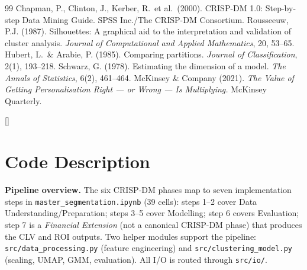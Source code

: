 \documentclass[10pt,a4paper]{article}
\begin{document}
{\begin{thebibliography}{99}
  Chapman, P., Clinton, J., Kerber, R.\ et al.\ (2000).
  CRISP-DM 1.0: Step-by-step Data Mining Guide. SPSS Inc./The CRISP-DM Consortium.
  Rousseeuw, P.J. (1987). Silhouettes: A graphical aid to the interpretation
  and validation of cluster analysis. \textit{Journal of Computational and
  Applied Mathematics}, 20, 53--65.
  Hubert, L.\ \& Arabie, P. (1985). Comparing partitions.
  \textit{Journal of Classification}, 2(1), 193--218.
  Schwarz, G. (1978). Estimating the dimension of a model.
  \textit{The Annals of Statistics}, 6(2), 461--464.
  McKinsey \& Company (2021). \textit{The Value of Getting Personalisation Right
  --- or Wrong --- Is Multiplying.} McKinsey Quarterly.
\end{thebibliography}
}

\appendix
{}
  [{\color{accent}\titlerule[0.4pt]}]
\titlespacing{\section}{0pt}{6pt}{2pt}

\section{Code Description}
\label{app:code}

\textbf{Pipeline overview.} The six CRISP-DM phases map to seven implementation
steps in \texttt{master\_segmentation.ipynb} (39 cells): steps 1--2 cover Data
Understanding/Preparation; steps 3--5 cover Modelling; step 6 covers Evaluation;
step 7 is a \textit{Financial Extension} (not a canonical CRISP-DM phase) that
produces the CLV and ROI outputs. Two helper modules support the pipeline:
\texttt{src/data\_processing.py} (feature engineering) and
\texttt{src/clustering\_model.py} (scaling, UMAP, GMM, evaluation). All I/O
is routed through \texttt{src/io/}.
\end{document}
